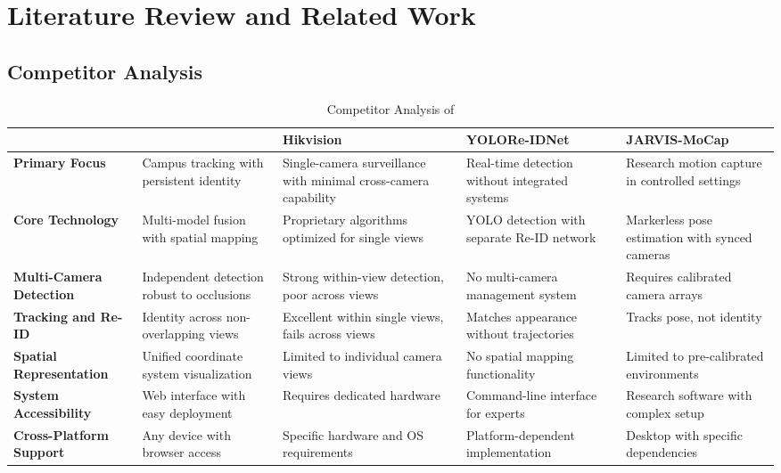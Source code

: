 \chapter{Literature Review and Related Work}
\label{chap:relatedworks}

\section{Competitor Analysis}
\label{section:competitor-analysis}

\begin{table}[htbp!]
   \begin{adjustwidth}{-.85in}{-.85in}
       \noindent
       \centering
       \small\begin{tabularx}{1.3\textwidth}{|X|>{\columncolor{green!20}}X|X|X|X|}
           \hline & \textbf{\usevar{\srsTitle}} & \textbf{Hikvision} & \textbf{YOLORe-IDNet} & \textbf{JARVIS-MoCap} \\\hline
           \textbf{Primary Focus} & Campus tracking with persistent identity & Single-camera surveillance with minimal cross-camera capability & Real-time detection without integrated systems & Research motion capture in controlled settings \\\hline
           \textbf{Core Technology} & Multi-model fusion with spatial mapping & Proprietary algorithms optimized for single views & YOLO detection with separate Re-ID network & Markerless pose estimation with synced cameras \\\hline
           \textbf{Multi-Camera Detection} & Independent detection robust to occlusions & Strong within-view detection, poor across views & No multi-camera management system & Requires calibrated camera arrays \\\hline
           \textbf{Tracking and Re-ID} & Identity across non-overlapping views & Excellent within single views, fails across views & Matches appearance without trajectories & Tracks pose, not identity \\\hline
           \textbf{Spatial Representation} & Unified coordinate system visualization & Limited to individual camera views & No spatial mapping functionality & Limited to pre-calibrated environments \\\hline
           \textbf{System Accessibility} & Web interface with easy deployment & Requires dedicated hardware & Command-line interface for experts & Research software with complex setup \\\hline
           \textbf{Cross-Platform Support} & Any device with browser access & Specific hardware and OS requirements & Platform-dependent implementation & Desktop with specific dependencies \\\hline
       \end{tabularx}
   \end{adjustwidth}
   \caption{Competitor Analysis of \usevar{\srsTitle}}
\end{table}

